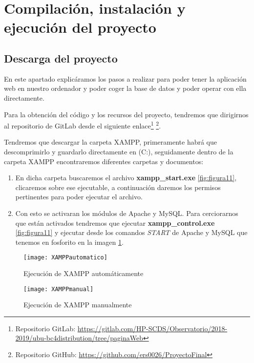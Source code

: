 \section{Compilación, instalación y ejecución del proyecto}\label{intalacionE}

\subsection{Descarga del proyecto}
En este apartado explicáramos los pasos a realizar para poder tener la aplicación web en nuestro ordenador y poder coger la base de datos y poder operar con ella directamente. 

Para la obtención del código y los recursos del proyecto, tendremos que dirigirnos al repositorio de GitLab desde el siguiente enlace\footnote{Repositorio GitLab: \url{https://gitlab.com/HP-SCDS/Observatorio/2018-2019/ubu-bc4distribution/tree/paginaWeb}} \footnote{Repositorio GitHub: \url{https://github.com/ers0026/ProyectoFinal}}.

Tendremos que descargar la carpeta XAMPP, primeramente habrá que descomprimirlo y guardarlo directamente en (C:), seguidamente dentro de la carpeta XAMPP encontraremos diferentes carpetas y documentos:

\begin{enumerate}
	\item En dicha carpeta buscaremos el archivo \textbf{xampp\_start.exe} \ref{fig:figura11}, clicaremos sobre ese ejecutable, a continuación daremos los permisos pertinentes para poder ejecutar el archivo.
	\item Con esto se activaran los módulos de Apache y MySQL. Para cerciorarnos que están activados tendremos que ejecutar \textbf{xampp\_control.exe} \ref{fig:figura11} y ejecutar desde los comandos \textit{START} de Apache y MySQL que tenemos en fosforito en la imagen \ref{fig:figura12}.
\end{enumerate}

\begin{figure}[h!]
	\centering
	\begin{minipage}[b]{0.8\linewidth}
		\centering
		\texttt{[image: XAMPPautomatico]}
		\caption{Ejecución de XAMPP automáticamente}
		\label{fig:figura11}
	\end{minipage}
	\begin{minipage}[b]{0.8\linewidth}
		\centering
		\texttt{[image: XAMPPmanual]}
		\caption{Ejecución de XAMPP manualmente}
		\label{fig:figura12}
	\end{minipage}
\end{figure}



